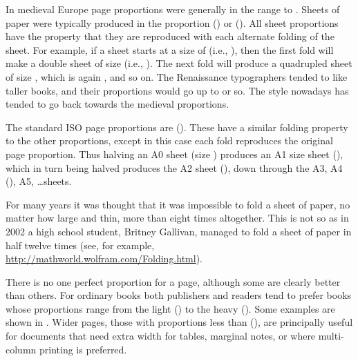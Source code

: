     In medieval Europe page proportions were generally in the range
 to . Sheets of paper were typically 
produced in the
proportion  () or  
(). 
All sheet proportions
have the property that they are reproduced with each alternate
folding of the sheet.
For example, if a sheet starts at a size of  
(i.e., ),
then the first fold will make a double sheet of size 
(i.e., ). The next fold will produce a quadrupled sheet of size
, which is again , and so on. 
 The Renaissance typographers tended to like taller books, and their 
proportions would go up to 
or so. The style nowadays has tended to go back towards the medieval
proportions.

    The standard ISO page proportions are 
 (). These
have a similar folding property to the other proportions, except in this case
each fold reproduces the original page proportion.
Thus halving an A0 sheet 
(size ) produces an A1 size sheet (),
which in turn being halved produces the A2 sheet (), down
through the A3, A4 (), A5, \ldots sheets.

For many years it was thought that it was impossible to fold a sheet of 
paper, no matter how large and thin, more than eight times 
altogether. This is not so as in 2002 a high school student, Britney Gallivan,
managed to fold a sheet of paper in half twelve times (see, for example,
\url{http://mathworld.wolfram.com/Folding.html}).


   There is no one perfect proportion for a page, 
although some are clearly better
than others. For ordinary books both publishers and readers tend to prefer
books whose proportions range from the light 
 () to the heavy
 (). Some examples are shown in .
 Wider pages, those with proportions less than
 (),
are principally useful for documents that need
extra width for tables, marginal notes, 
or where multi-column printing is preferred. 

